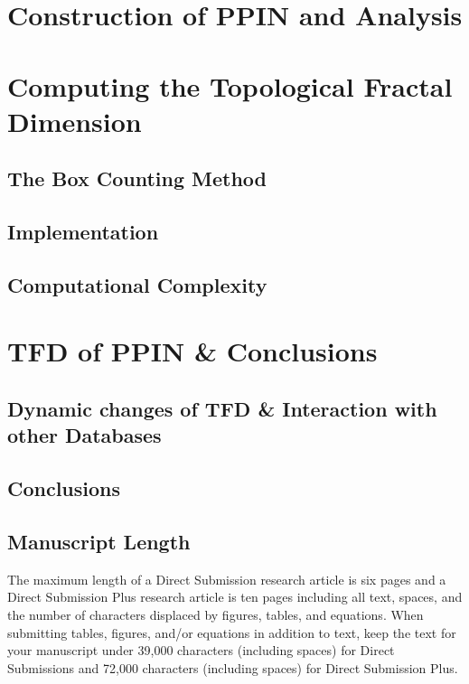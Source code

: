 \documentclass[10pt,twoside]{pnas-new}
\begin{document}
\section{Construction of PPIN and Analysis}


\section{Computing the Topological Fractal Dimension}

\subsection{The Box Counting Method}

\subsection{Implementation}

\subsection{Computational Complexity}

\section{TFD of PPIN \& Conclusions}

\subsection{Dynamic changes of TFD \& Interaction with other Databases}

\subsection{Conclusions}



\subsection*{Manuscript Length}

The maximum length of a Direct Submission research article is six pages and a Direct Submission Plus research article is ten pages including all text, spaces, and the number of characters displaced by figures, tables, and equations.  When submitting tables, figures, and/or equations in addition to text, keep the text for your manuscript under 39,000 characters (including spaces) for Direct Submissions and 72,000 characters (including spaces) for Direct Submission Plus.
\end{document}
